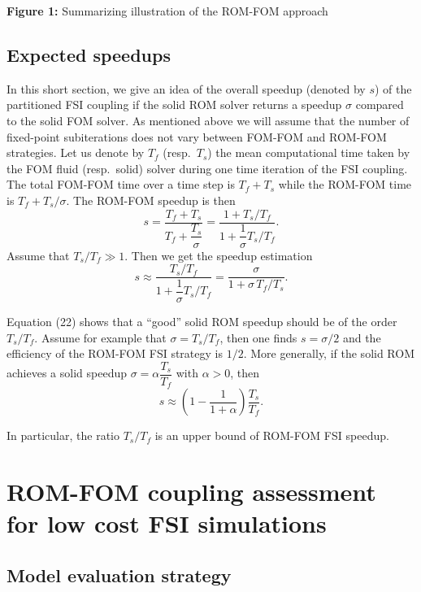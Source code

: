 \documentclass[11pt]{article}
\begin{document}
\begin{center}
\textbf{Figure 1:} Summarizing illustration of the ROM-FOM approach
\end{center}

\subsection{Expected speedups}

In this short section, we give an idea of the overall speedup (denoted by $s$) of the partitioned FSI coupling if the solid ROM solver returns a speedup $\sigma$ compared to the solid FOM solver. As mentioned above we will assume that the number of fixed-point subiterations does not vary between FOM-FOM and ROM-FOM strategies. Let us denote by $T_f$ (resp.\ $T_s$) the mean computational time taken by the FOM fluid (resp.\ solid) solver during one time iteration of the FSI coupling. The total FOM-FOM time over a time step is $T_f + T_s$ while the ROM-FOM time is $T_f + T_s/\sigma$. The ROM-FOM speedup is then
\begin{equation}
\tag{22}
s =
\frac{T_f + T_s}{T_f + \dfrac{T_s}{\sigma}}
=
\frac{1 + T_s/T_f}{1 + \dfrac{1}{\sigma}T_s/T_f}.
\end{equation}
Assume that $T_s/T_f \gg 1$. Then we get the speedup estimation
\[
s \approx
\frac{T_s/T_f}{1 + \dfrac{1}{\sigma}T_s/T_f}
=
\frac{\sigma}{1 + \sigma\,T_f/T_s}.
\]

Equation (22) shows that a ``good'' solid ROM speedup should be of the order $T_s/T_f$. Assume for example that $\sigma = T_s/T_f$, then one finds $s = \sigma/2$ and the efficiency of the ROM-FOM FSI strategy is $1/2$. More generally, if the solid ROM achieves a solid speedup $\sigma = \alpha \dfrac{T_s}{T_f}$ with $\alpha > 0$, then
\[
s \approx
\left(
1 - \frac{1}{1+\alpha}
\right)
\frac{T_s}{T_f}.
\]

In particular, the ratio $T_s/T_f$ is an upper bound of ROM-FOM FSI speedup.

\section{ROM-FOM coupling assessment for low cost FSI simulations}

\subsection{Model evaluation strategy}
\end{document}
